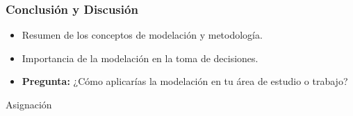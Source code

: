 \documentclass{beamer}
\begin{document}
\begin{frame}
    \frametitle{Conclusión y Discusión}
    \begin{itemize}
        \item Resumen de los conceptos de modelación y metodología.
        \item Importancia de la modelación en la toma de decisiones.
        \item \textbf{Pregunta:} ¿Cómo aplicarías la modelación en tu área de estudio o trabajo?
    \end{itemize}
\end{frame}

\begin{frame}{Asignación}
    
\end{frame}
\end{document}
